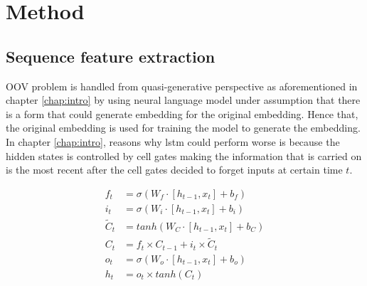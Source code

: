 \chapter{Method}
\label{chap:method}

\section{Sequence feature extraction}
OOV problem is handled from quasi-generative perspective as
aforementioned in chapter \ref{chap:intro} by using neural language model
under assumption that there is a form that could generate embedding
for the original embedding. Hence that, the original embedding is used
for training the model to generate the embedding. In chapter
\ref{chap:intro}, reasons why lstm could perform worse is because the
hidden states is controlled by cell gates making the information that
is carried on is the most recent after the cell gates decided to
forget inputs at certain time $t$. 

\begin{align}
    \label{eq:lstm:f_t}
    f_t &= \sigma(W_f \cdot [h_{t-1}, x_t] + b_f) \\
    \label{eq:lstm:i_t}    
    i_t &= \sigma(W_i \cdot [h_{t-1}, x_t] + b_i) \\
    \label{eq:lstm:Cc_t}
    \tilde{C}_t &= tanh(W_C \cdot [h_{t-1}, x_t] + b_C) \\
    \label{eq:lstm:C_t}
    C_t &= f_t \times C_{t-1} + i_t \times \tilde{C}_t \\
    \label{eq:lstm:o_t}
    o_t &= \sigma(W_o \cdot [h_{t-1}, x_t] + b_o) \\
    \label{eq:lstm:h_t}
    h_t &= o_t \times tanh(C_t)
\end{align}

